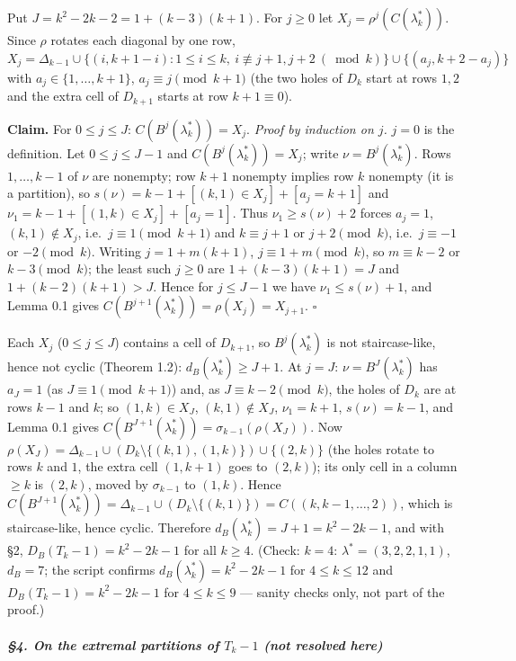 \documentclass[11pt,a4paper]{article}
\begin{document}
Put \(J=k^2-2k-2=1+(k-3)(k+1)\). For \(j\ge0\) let
\(X_j=\rho^j(C(\lambda^*_k))\). Since \(\rho\) rotates each diagonal by
one row,
\(X_j=\Delta_{k-1}\cup\{(i,k+1-i):1\le i\le k,\ i\not\equiv j+1,j+2\ (\bmod k)\}\cup\{(a_j,k+2-a_j)\}\)
with \(a_j\in\{1,\dots,k+1\}\), \(a_j\equiv j\pmod{k+1}\) (the two holes
of \(D_k\) start at rows \(1,2\) and the extra cell of \(D_{k+1}\)
starts at row \(k+1\equiv0\)).

\textbf{Claim.} For \(0\le j\le J\): \(C(B^j(\lambda^*_k))=X_j\).
\emph{Proof by induction on \(j\).} \(j=0\) is the definition. Let
\(0\le j\le J-1\) and \(C(B^j(\lambda^*_k))=X_j\); write
\(\nu=B^j(\lambda^*_k)\). Rows \(1,\dots,k-1\) of \(\nu\) are nonempty;
row \(k+1\) nonempty implies row \(k\) nonempty (it is a partition), so
\(s(\nu)=k-1+[(k,1)\in X_j]+[a_j=k+1]\) and
\(\nu_1=k-1+[(1,k)\in X_j]+[a_j=1]\). Thus \(\nu_1\ge s(\nu)+2\) forces
\(a_j=1\), \((k,1)\notin X_j\), i.e.~\(j\equiv1\pmod{k+1}\) and
\(k\equiv j+1\) or \(j+2\pmod k\), i.e.~\(j\equiv-1\) or \(-2\pmod k\).
Writing \(j=1+m(k+1)\), \(j\equiv 1+m\pmod k\), so \(m\equiv k-2\) or
\(k-3\pmod k\); the least such \(j\ge0\) are \(1+(k-3)(k+1)=J\) and
\(1+(k-2)(k+1)>J\). Hence for \(j\le J-1\) we have
\(\nu_1\le s(\nu)+1\), and Lemma 0.1 gives
\(C(B^{j+1}(\lambda^*_k))=\rho(X_j)=X_{j+1}\). \(\square\)

Each \(X_j\) (\(0\le j\le J\)) contains a cell of \(D_{k+1}\), so
\(B^j(\lambda^*_k)\) is not staircase-like, hence not cyclic (Theorem
1.2): \(d_B(\lambda^*_k)\ge J+1\). At \(j=J\): \(\nu=B^J(\lambda^*_k)\)
has \(a_J=1\) (as \(J\equiv1\pmod{k+1}\)) and, as
\(J\equiv k-2\pmod k\), the holes of \(D_k\) are at rows \(k-1\) and
\(k\); so \((1,k)\in X_J\), \((k,1)\notin X_J\), \(\nu_1=k+1\),
\(s(\nu)=k-1\), and Lemma 0.1 gives
\(C(B^{J+1}(\lambda^*_k))=\sigma_{k-1}(\rho(X_J))\). Now
\(\rho(X_J)=\Delta_{k-1}\cup(D_k\setminus\{(k,1),(1,k)\})\cup\{(2,k)\}\)
(the holes rotate to rows \(k\) and \(1\), the extra cell \((1,k+1)\)
goes to \((2,k)\)); its only cell in a column \(\ge k\) is \((2,k)\),
moved by \(\sigma_{k-1}\) to \((1,k)\). Hence
\(C(B^{J+1}(\lambda^*_k))=\Delta_{k-1}\cup(D_k\setminus\{(k,1)\})=C((k,k-1,\dots,2))\),
which is staircase-like, hence cyclic. Therefore
\(d_B(\lambda^*_k)=J+1=k^2-2k-1\), and with §2, \(D_B(T_k-1)=k^2-2k-1\)
for all \(k\ge4\). (Check: \(k=4\): \(\lambda^*=(3,2,2,1,1)\),
\(d_B=7\); the script confirms \(d_B(\lambda^*_k)=k^2-2k-1\) for
\(4\le k\le12\) and \(D_B(T_k-1)=k^2-2k-1\) for \(4\le k\le9\) ---
sanity checks only, not part of the proof.)

\subparagraph{\texorpdfstring{§4. On the extremal partitions of
\(T_k-1\) (not resolved
here)}{§4. On the extremal partitions of T\_k-1 (not resolved here)}}\label{on-the-extremal-partitions-of-t_k-1-not-resolved-here}
\end{document}

